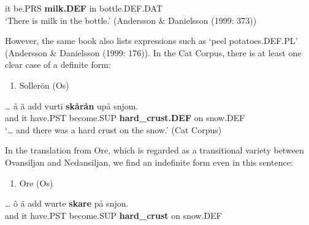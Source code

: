 it  be.PRS  \textbf{milk.DEF} in  bottle.DEF.DAT\\ %


‘There is milk in the bottle.’ (Andersson \& Danielsson (1999: 373))
\z

However, the same book also lists expressions such as  ‘peel potatoes.DEF.PL’ (Andersson \& Danielsson (1999: 176)). In the Cat Corpus, there is at least one clear case of a definite form:

\begin{enumerate} %
\item 
Sollerön (Os) 

\end{enumerate} %
\ea\label{}
\gll …  å  ä  add  vurti  \textbf{skårån} upå  snjom.\\


  and  it  have.PST  become.SUP  \textbf{hard\_crust.DEF} on  snow.DEF\\ %


‘… and there was a hard crust on the snow.’ (Cat Corpus)
\z


In the translation from Ore, which is regarded as a transitional variety between Ovansiljan and Nedansiljan, we find an indefinite form even in this sentence:

\begin{enumerate} %
\item 
Ore (Os)

\end{enumerate} %
\ea\label{}
\gll …  ô  ä  add  wurte  \textbf{skare} på  snjon.\\


  and  it  have.PST  become.SUP  \textbf{hard\_crust} on  snow.DEF\\ %


